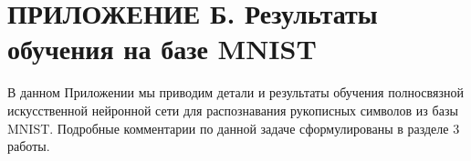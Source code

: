 \documentclass[a4paper,12pt,russian]{article} %
\begin{document}
\newpage
\section*{ПРИЛОЖЕНИЕ Б. Результаты обучения на базе MNIST} \label{app:mnist}

В данном Приложении мы приводим детали и результаты обучения полносвязной искусственной нейронной сети для распознавания рукописных символов из базы MNIST. Подробные комментарии по данной задаче сформулированы в разделе 3 работы.




\end{document}
